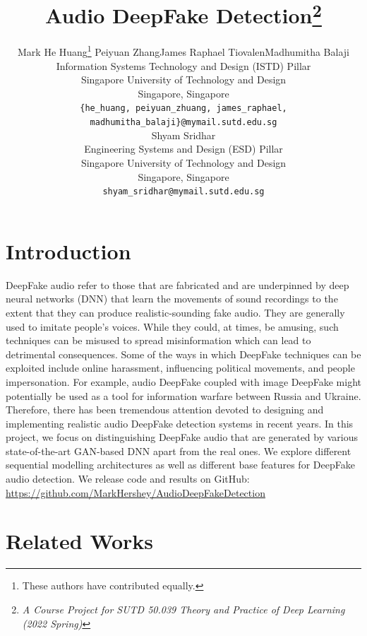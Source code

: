 \documentclass{article}
\title{Audio DeepFake Detection\thanks{\textit{A Course Project for SUTD 50.039 Theory and Practice of Deep Learning (2022 Spring)}}
}
\author{
    Mark He Huang\thanks{These authors have contributed equally.} \hfill Peiyuan Zhang\footnotemark[2] \hfill James Raphael Tiovalen\footnotemark[2] \hfill Madhumitha Balaji\footnotemark[2]\\
    Information Systems Technology and Design (ISTD) Pillar \\
    Singapore University of Technology and Design \\
    Singapore, Singapore\\
    \texttt{\{he\_huang, peiyuan\_zhuang, james\_raphael, madhumitha\_balaji\}@mymail.sutd.edu.sg} \\
    \And
    Shyam Sridhar\footnotemark[2] \\
    Engineering Systems and Design (ESD) Pillar \\
    Singapore University of Technology and Design \\
    Singapore, Singapore\\
    \texttt{shyam\_sridhar@mymail.sutd.edu.sg} \\
}
\begin{document}
\maketitle



\section{Introduction}

DeepFake audio refer to those that are fabricated and are underpinned by deep neural networks (DNN) that learn the movements of sound recordings to the extent that they can produce realistic-sounding fake audio. They are generally used to imitate people's voices. While they could, at times, be amusing, such techniques can be misused to spread misinformation which can lead to detrimental consequences. Some of the ways in which DeepFake techniques can be exploited include online harassment, influencing political movements, and people impersonation. For example, audio DeepFake coupled with image DeepFake might potentially be used as a tool for information warfare between Russia and Ukraine\cite{Zelensky}. Therefore, there has been tremendous attention devoted to designing and implementing realistic audio DeepFake detection systems in recent years. In this project, we focus on distinguishing DeepFake audio that are generated by various state-of-the-art GAN-based DNN apart from the real ones. We explore different sequential modelling architectures as well as different base features for DeepFake audio detection. We release code and results on GitHub: \url{https://github.com/MarkHershey/AudioDeepFakeDetection}

\section{Related Works}
\end{document}
